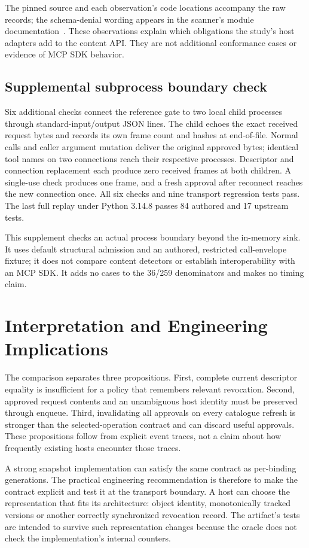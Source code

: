The pinned source and each observation's code locations accompany the raw records;
the schema-denial wording appears in the scanner's module documentation~\cite{sentineltpd}.
These observations explain which obligations the study's host adapters add to the
content API. They are not additional conformance cases or evidence of MCP SDK behavior.

\subsection{Supplemental subprocess boundary check}
Six additional checks connect the reference gate to two local child processes
through standard-input/output JSON lines. The child echoes the exact received
request bytes and records its own frame count and hashes at end-of-file. Normal
calls and caller argument mutation deliver the original approved bytes; identical
tool names on two connections reach their respective processes. Descriptor and
connection replacement each produce zero received frames at both children. A
single-use check produces one frame, and a fresh approval after reconnect reaches
the new connection once. All six checks and nine transport regression tests pass.
The last full replay under Python 3.14.8 passes 84 authored and 17 upstream tests.

This supplement checks an actual process boundary beyond the in-memory sink. It
uses default structural admission and an authored, restricted call-envelope
fixture; it does not compare content detectors or establish interoperability with
an MCP SDK. It adds no cases to the 36/259 denominators and makes no timing claim.

\section{Interpretation and Engineering Implications}
The comparison separates three propositions. First, complete current descriptor
equality is insufficient for a policy that remembers relevant revocation. Second,
approved request contents and an unambiguous host identity must be preserved through
enqueue. Third, invalidating all approvals on every
catalogue refresh is stronger than the selected-operation contract and can discard
useful approvals. These propositions follow from explicit event traces, not a
claim about how frequently existing hosts encounter those traces.

A strong snapshot implementation can satisfy the same contract as per-binding
generations. The practical engineering recommendation is therefore to make the
contract explicit and test it at the transport boundary. A host can choose the
representation that fits its architecture: object identity, monotonically tracked
versions or another correctly synchronized revocation record. The artifact's
tests are intended to survive such representation changes because the oracle
does not check the implementation's internal counters.

